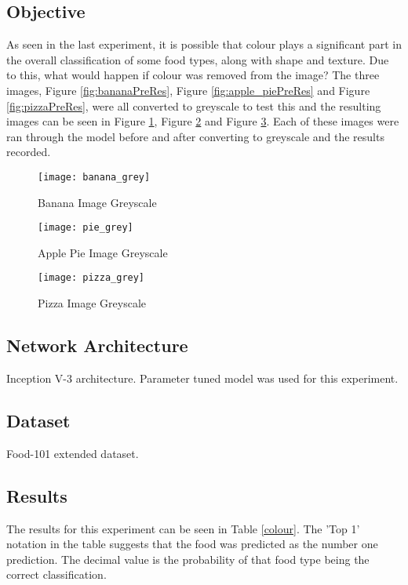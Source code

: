 \subsection*{Objective}
As seen in the last experiment, it is possible that colour plays a significant part in the overall classification of some food types, along with shape and texture. Due to this, what would happen if colour was removed from the image? The three images, Figure \ref{fig:bananaPreRes}, Figure \ref{fig:apple_piePreRes} and Figure \ref{fig:pizzaPreRes}, were all converted to greyscale to test this and the resulting images can be seen in Figure \ref{fig:bananaGrey}, Figure \ref{fig:applePieGrey} and Figure \ref{fig:pizzaGrey}. Each of these images were ran through the model before and after converting to greyscale and the results recorded.

\begin{figure}
    \texttt{[image: banana\_grey]}
    \caption{Banana Image Greyscale}
    \label{fig:bananaGrey}
\end{figure}

\begin{figure}
    \texttt{[image: pie\_grey]}
    \caption{Apple Pie Image Greyscale}
    \label{fig:applePieGrey}
\end{figure}

\begin{figure}
    \texttt{[image: pizza\_grey]}
    \caption{Pizza Image Greyscale}
    \label{fig:pizzaGrey}
\end{figure}

\subsection*{Network Architecture}
Inception V-3 architecture. Parameter tuned model was used for this experiment.

\subsection*{Dataset}
Food-101 extended dataset.

\subsection*{Results}
The results for this experiment can be seen in Table \ref{colour}.
The 'Top 1' notation in the table suggests that the food was predicted as the number one prediction. The decimal value is the probability of that food type being the correct classification.

